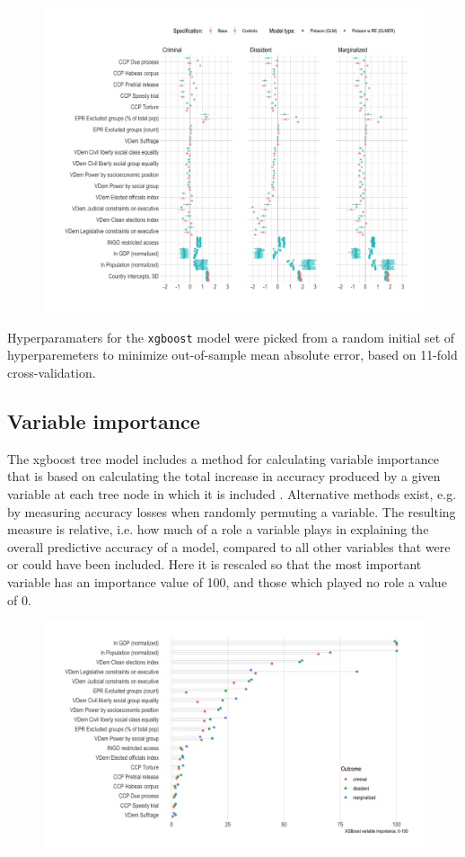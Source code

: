 \documentclass[12pt]{article}
\begin{document}
\begin{figure}
\includegraphics[width=.9\textwidth]{../output/figures/model-coefs-all-model-forms.png}
\end{figure}

Hyperparamaters for the \texttt{xgboost} model were picked from a random initial set of hyperparemeters to minimize out-of-sample mean absolute error, based on 11-fold cross-validation. 

\subsection{Variable importance}

The xgboost tree model includes a method for calculating variable importance that is based on calculating the total increase in accuracy produced by a given variable at each tree node in which it is included \citep{chen2016xgboost}. Alternative methods exist, e.g. by measuring accuracy losses when randomly permuting a variable. The resulting measure is relative, i.e. how much of a role a variable plays in explaining the overall predictive accuracy of a model, compared to all other variables that were or could have been included. Here it is rescaled so that the most important variable has an importance value of 100, and those which played no role a value of 0. 

\begin{figure}
\includegraphics[width=.9\textwidth]{../output/figures/xgboost-variable-importance-v1.png}
\end{figure}
\end{document}
